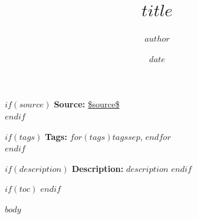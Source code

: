 \documentclass[a4paper, 12pt, twoside]{article}
\title{$title$}
\author{$author$}
\date{$date$}
\begin{document}
    
    
    \vspace{10pt}
    \begin{flushleft}
    $if(source)$
    \small \textbf{Source:} \url{$source$} \\
    $endif$

    $if(tags)$
    \small \textbf{Tags:} $for(tags)$$tags$$sep$, $endfor$ \\
    $endif$

    $if(description)$
    \small \textbf{Description:} $description$
    $endif$
    \end{flushleft}
    \vspace{10pt}
    
    $if(toc)$
    \tableofcontents
    \newpage
    $endif$

    $body$

    \printglossaries

    \printbibliography[heading=bibnumbered]
\end{document}
